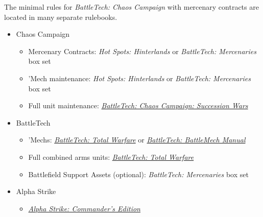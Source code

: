 The minimal rules for \emph{BattleTech: Chaos Campaign} with mercenary contracts are located in many separate rulebooks.

\begin{itemize}

\item Chaos Campaign

  \begin{itemize}

    \item Mercenary Contracts: \emph{Hot Spots: Hinterlands} or \emph{BattleTech: Mercenaries} box set

    \item 'Mech maintenance: \emph{Hot Spots: Hinterlands} or \emph{BattleTech: Mercenaries} box set

    \item Full unit maintenance: \emph{\href{https://store.catalystgamelabs.com/products/battletech-chaos-campaign-succession-wars}{BattleTech: Chaos Campaign: Succession Wars}}

  \end{itemize}

  \item BattleTech

  \begin{itemize}

    \item 'Mechs: \emph{\href{https://store.catalystgamelabs.com/products/battletech-total-warfare-pdf}{BattleTech: Total Warfare}} or  \emph{\href{https://store.catalystgamelabs.com/products/battletech-battlemech-manual-book-pdf-combo}{BattleTech: BattleMech Manual}}

    \item Full combined arms units: \emph{\href{https://store.catalystgamelabs.com/products/battletech-total-warfare-pdf}{BattleTech: Total Warfare}}

    \item Battlefield Support Assets (optional): \emph{BattleTech: Mercenaries} box set

  \end{itemize}

  \item Alpha Strike

  \begin{itemize}

    \item \emph{\href{https://store.catalystgamelabs.com/products/battletech-alpha-strike-commanders-edition}{Alpha Strike: Commander's Edition}}

  \end{itemize}

\end{itemize}
